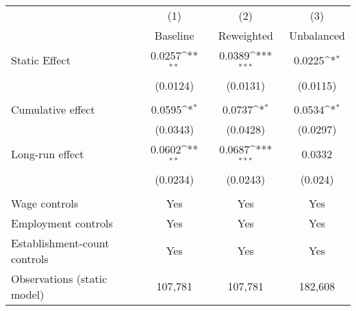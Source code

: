 {
\def\sym#1{\ifmmode^{#1}\else\(^{#1}\)\fi}
\begin{tabular}{l*{3}{c}}
\hline\hline
          &\multicolumn{1}{c}{(1)}&\multicolumn{1}{c}{(2)}&\multicolumn{1}{c}{(3)}\\
          &\multicolumn{1}{c}{Baseline}&\multicolumn{1}{c}{Reweighted}&\multicolumn{1}{c}{Unbalanced}\\
\hline
Static Effect&   0.0257\sym{**} &   0.0389\sym{***}&   0.0225\sym{*}  \\
          & (0.0124)         & (0.0131)         & (0.0115)         \\
\hline
\vspace{-2mm}&                  &                  &                  \\
Cumulative effect&0.0595\sym{*}         &0.0737\sym{*}         &0.0534\sym{*}         \\
          & (0.0343)         & (0.0428)         & (0.0297)         \\
Long-run effect&0.0602\sym{**}         &0.0687\sym{***}         &   0.0332         \\
          & (0.0234)         & (0.0243)         &  (0.024)         \\
\hline    &                  &                  &                  \\
Wage controls&      Yes         &      Yes         &      Yes         \\
Employment controls&      Yes         &      Yes         &      Yes         \\
Establishment-count controls&      Yes         &      Yes         &      Yes         \\
Observations (static model)&  107,781         &  107,781         &  182,608         \\
\hline\hline
\end{tabular}
}
